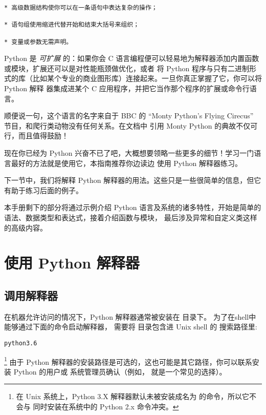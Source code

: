 \documentclass[a4paper,10pt,english]{sphinxmanual}
\begin{document}
\begin{Verbatim}[commandchars=\\\{\}]
* 高级数据结构使你可以在一条语句中表达复杂的操作；

* 语句组使用缩进代替开始和结束大括号来组织；

* 变量或参数无需声明。
\end{Verbatim}

Python 是 \emph{可扩展} 的：如果你会 C 语言编程便可以轻易地为解释器添加内置函数或模块，扩展还可以是对性能瓶颈做优化，或者
将 Python 程序与只有二进制形式的库（比如某个专业的商业图形库）连接起来。一旦你真正掌握了它，你可以将 Python 解释
器集成进某个 C 应用程序，并把它当作那个程序的扩展或命令行语言。

顺便说一句，这个语言的名字来自于 BBC 的 “Monty Python’s Flying Cirecus” 节目，和爬行类动物没有任何关系。在文档中
引用 Monty Python 的典故不仅可行，而且值得鼓励！

现在你已经为 Python 兴奋不已了吧，大概想要领略一些更多的细节！学习一门语言最好的方法就是使用它，本指南推荐你边读边
使用 Python 解释器练习。

下一节中，我们将解释 Python 解释器的用法。这些只是一些很简单的信息，但它有助于练习后面的例子。

本手册剩下的部分将通过示例介绍 Python 语言及系统的诸多特性，开始是简单的语法、数据类型和表达式，接着介绍函数与模块，
最后涉及异常和自定义类这样的高级内容。


\chapter{使用 Python 解释器}
\label{interpreter:tut-using}\label{interpreter:python}\label{interpreter::doc}

\section{调用解释器}
\label{interpreter:tut-invoking}\label{interpreter:id1}
在机器允许访问的情况下，Python 解释器通常被安装在  目录下。
为了在shell中能够通过下面的命令启动解释器， 需要将  目录包含进 Unix shell 的
搜索路径里:

\begin{Verbatim}[commandchars=\\\{\}]
python3.6
\end{Verbatim}

\footnote{
在 Unix 系统上，Python 3.X 解释器默认未被安装成名为  的命令，所以它不会与
同时安装在系统中的 Python 2.x 命令冲突。
} 由于 Python 解释器的安装路径是可选的，这也可能是其它路径，你可以联系安装 Python 的用户或
系统管理员确认（例如， 就是一个常见的选择）。
\end{document}
